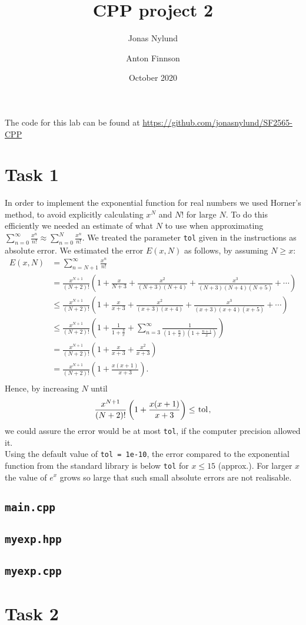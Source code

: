 \documentclass[12pt]{article}
\title{CPP project 2}
\author{Jonas Nylund \and Anton Finnson}
\date{October 2020}
\begin{document}
\maketitle

The code for this lab can be found at \href{https://github.com/jonasnylund/SF2565-CPP}{https://github.com/jonasnylund/SF2565-CPP}

% 

\section{Task 1}
In order to implement the exponential function for real numbers we used Horner's method, to avoid explicitly calculating $x^N$ and $N!$ for large $N$. To do this efficiently we needed an estimate of what $N$ to use when approximating $\sum_{n=0}^\infty \frac{x^n}{n!} \approx \sum_{n=0}^N \frac{x^n}{n!}.$ We treated the parameter \lstinline{tol} given in the instructions as absolute error. We estimated the error $E(x, N)$ as follows, by assuming $N \geq x$:
\begin{align*}
    E(x, N) &= \sum_{n = N+1}^\infty \frac{x^n}{n!}\\ &=\frac{x^{N+1}}{(N+2)!}\left(1 + \frac{x}{N+3} + \frac{x^2}{(N+3)(N+4)}
    + \frac{x^3}{(N+3)(N+4)(N+5)} + \cdots \right)\\
    &\leq \frac{x^{N+1}}{(N+2)!}\left(1 + \frac{x}{x+3} + \frac{x^2}{(x+3)(x+4)}
    + \frac{x^3}{(x+3)(x+4)(x+5)} + \cdots\right)\\
    &\leq \frac{x^{N+1}}{(N+2)!}\left(1 + \frac{1}{1 + \frac{3}{x}} + \sum_{n = 3}^\infty \frac{1}{(1+\frac{n}{x})(1 + \frac{n+1}{x})} \right)\\
    &= \frac{x^{N+1}}{(N+2)!}\left(1 + \frac{x}{x + 3} + \frac{x^2}{x+3}\right)\\
    &= \frac{x^{N+1}}{(N+2)!}\left(1 + \frac{x(x+1)}{x + 3}\right).\\
\end{align*}
Hence, by increasing $N$ until 
\begin{align*}
    \frac{x^{N+1}}{(N+2)!}\left(1 + \frac{x(x+1)}{x + 3}\right) \leq \lstinline{tol},
\end{align*}
we could assure the error would be at most \lstinline{tol}, if the computer precision allowed it.\\

Using the default value of \lstinline{tol = 1e-10}, the error compared to the exponential function from the standard library is below \lstinline{tol} for $x \leq 15$  (approx.). For larger $x$ the value of $e^x$ grows so large that such small absolute errors are not realisable.
\subsection*{\texttt{main.cpp}}

\subsection*{\texttt{myexp.hpp}}

\subsection*{\texttt{myexp.cpp}}

\newpage
\section{Task 2}
\end{document}
